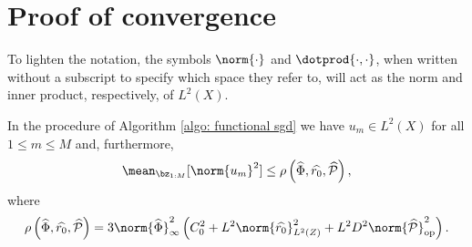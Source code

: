 \section{Proof of convergence}

To lighten the notation, the symbols $ \norm{ \cdot } $ and $ \dotprod{ \cdot, \cdot } $, when written without a subscript to specify which space they refer to, will act as the norm and inner product, respectively, of $ L^2 ( X ) $.

\begin{lemma}
    \label{lem: bound u_m}
    In the procedure of Algorithm \ref{algo: functional sgd} we have $ u_{ m } \in L^{ 2 } ( X ) $ for all $ 1 \leq m \leq M $ and, furthermore,
    \begin{equation*}
        \mean_{ \bz_{ 1:M } } [ \norm{ u_{ m } }^2 ] \leq
        \rho \left( \hat{ \Phi }, \hat{ r_{ 0 } }, \hat{ \meanop } \right) 
    ,\end{equation*}
    where
    \begin{equation*}
        \rho \left( \hat{ \Phi }, \hat{ r_{ 0 } }, \hat{ \meanop } \right) =
        3 \norm{ \hat{ \Phi } }_{ \infty }^2 \left(
            C_{ 0 }^2 + L^2 \norm{ \hat{ r_{ 0 } } }_{ L^2 ( Z ) }^2 + L^2 D^2 \norm{ \hat{ \meanop } }_{ \op }^2
        \right)
    .\end{equation*}
\end{lemma}
